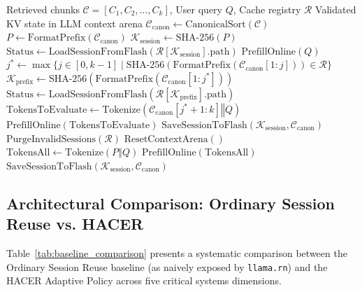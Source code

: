 \begin{algorithm}[H]
\caption{HACER Adaptive Cache Validation and Repair}
\label{alg:hacer_repair}
\begin{algorithmic}[1]
\REQUIRE Retrieved chunks $\mathcal{C} = [C_1, C_2, \dots, C_k]$, User query $Q$, Cache registry $\mathcal{R}$
\ENSURE Validated KV state in LLM context arena
\STATE $\mathcal{C}_{\text{canon}} \gets \text{CanonicalSort}(\mathcal{C})$
\STATE $P \gets \text{FormatPrefix}(\mathcal{C}_{\text{canon}})$
\STATE $\mathcal{K}_{\text{session}} \gets \text{SHA-256}(P)$
    \STATE {}
    \STATE $\text{Status} \gets \text{LoadSessionFromFlash}(\mathcal{R}[\mathcal{K}_{\text{session}}].\text{path})$
        \STATE $\text{PrefillOnline}(Q)$
        \RETURN
    \ENDIF
\ENDIF
\STATE {}
\STATE $j^* \gets \max \{ j \in [0, k-1] \mid \text{SHA-256}(\text{FormatPrefix}(\mathcal{C}_{\text{canon}}[1:j])) \in \mathcal{R} \}$
    \STATE $\mathcal{K}_{\text{prefix}} \gets \text{SHA-256}(\text{FormatPrefix}(\mathcal{C}_{\text{canon}}[1:j^*]))$
    \STATE $\text{Status} \gets \text{LoadSessionFromFlash}(\mathcal{R}[\mathcal{K}_{\text{prefix}}].\text{path})$
        \STATE $\text{TokensToEvaluate} \gets \text{Tokenize}(\mathcal{C}_{\text{canon}}[j^*+1:k] \mathbin{\Vert} Q)$
        \STATE $\text{PrefillOnline}(\text{TokensToEvaluate})$
        \STATE $\text{SaveSessionToFlash}(\mathcal{K}_{\text{session}}, \mathcal{C}_{\text{canon}})$
        \RETURN
    \ENDIF
\ENDIF
\STATE {}
\STATE $\text{PurgeInvalidSessions}(\mathcal{R})$
\STATE $\text{ResetContextArena}()$
\STATE $\text{TokensAll} \gets \text{Tokenize}(P \mathbin{\Vert} Q)$
\STATE $\text{PrefillOnline}(\text{TokensAll})$
\STATE $\text{SaveSessionToFlash}(\mathcal{K}_{\text{session}}, \mathcal{C}_{\text{canon}})$
\end{algorithmic}
\end{algorithm}

\subsection{Architectural Comparison: Ordinary Session Reuse vs. HACER}
Table~\ref{tab:baseline_comparison} presents a systematic comparison between the Ordinary Session Reuse baseline (as naively exposed by \texttt{llama.rn}) and the HACER Adaptive Policy across five critical systems dimensions.

